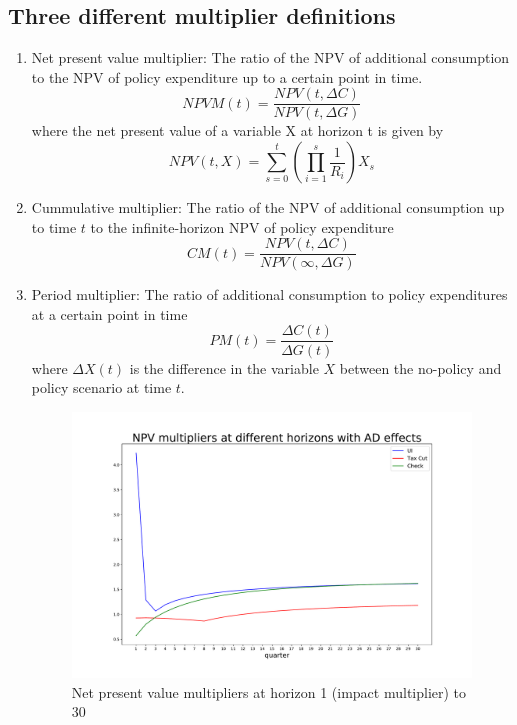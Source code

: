 \documentclass[]{article}
\begin{document}
\FloatBarrier
\subsection{Three different multiplier definitions}



\begin{enumerate}
		

	
	\item Net present value multiplier: The ratio of the NPV of additional consumption to the NPV of policy expenditure up to a certain point in time.
	\begin{equation}
	NPVM(t) = \frac{NPV(t,\Delta C)}{NPV (t,\Delta G)}
	\end{equation}	
	where the net present value of a variable X at horizon t is given by
	\begin{equation}
	NPV(t,X) = \sum_{s=0}^{t} \left( \prod_{i=1}^{s} \frac{1}{R_i} \right) X_s
	\end{equation}
	
	\item Cummulative multiplier: The ratio of the NPV of additional consumption up to time $t$ to the infinite-horizon NPV of policy expenditure
	\begin{equation}
	CM(t) = \frac{NPV(t,\Delta C)}{NPV (\infty,\Delta G)}
	\end{equation}
	
	\item Period multiplier: The ratio of additional consumption to policy expenditures at a certain point in time
	\begin{equation}
	PM(t) = \frac{\Delta C (t) }{\Delta G(t)}
	\end{equation}	
	where $\Delta X(t)$ is the difference in the variable $X$ between the no-policy and policy scenario at time $t$.	
	
	
	
	
	\begin{figure}
		\centering
		\includegraphics[width=\linewidth]{../Full_Run_3Educ_Nov4th/NPV_multipliers}
		\caption{Net present value multipliers at horizon 1 (impact multiplier) to 30}
		\label{fig:npvmultipliers}
	\end{figure}
	

\end{enumerate}
\end{document}
